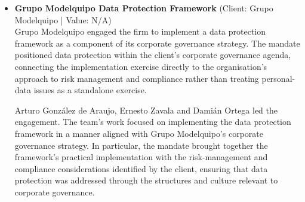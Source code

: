 \documentclass[11pt]{article}
\begin{document}
\begin{itemize}
Arturo González de Araujo, Ernesto Zavala and Damián Ortega led the matter for Grupo Excelsior. Their role was to design and implement the internal policies and training programmes required for the client’s restructured operations. The internal policies established documented standards for the treatment of data-protection issues within the business, while the training programmes equipped personnel to apply those standards in the course of their operational responsibilities. The combination of policy design, implementation and training connected the legal requirements of data protection directly to the client’s regularisation process.

The result was a significant strengthening of Grupo Excelsior’s compliance posture and a reduction in its regulatory exposure. The matter demonstrates the team’s ability to undertake data-protection work through an operational regularisation and restructuring mandate, delivering internal policies and training programmes that support the practical implementation of compliance requirements. Arturo González de Araujo, Ernesto Zavala and Damián Ortega’s involvement evidences a three-partner team deployment focused on converting data-protection requirements into implemented internal measures for Grupo Excelsior.
\item \textbf{Grupo Modelquipo Data Protection Framework} (Client: Grupo Modelquipo | Value: N/A)\\ Grupo Modelquipo engaged the firm to implement a data protection framework as a component of its corporate governance strategy. The mandate positioned data protection within the client’s corporate governance agenda, connecting the implementation exercise directly to the organisation’s approach to risk management and compliance rather than treating personal-data issues as a standalone exercise.

Arturo González de Araujo, Ernesto Zavala and Damián Ortega led the engagement. The team’s work focused on implementing the data protection framework in a manner aligned with Grupo Modelquipo’s corporate governance strategy. In particular, the mandate brought together the framework’s practical implementation with the risk-management and compliance considerations identified by the client, ensuring that data protection was addressed through the structures and culture relevant to corporate governance.


\end{itemize}
\end{document}
